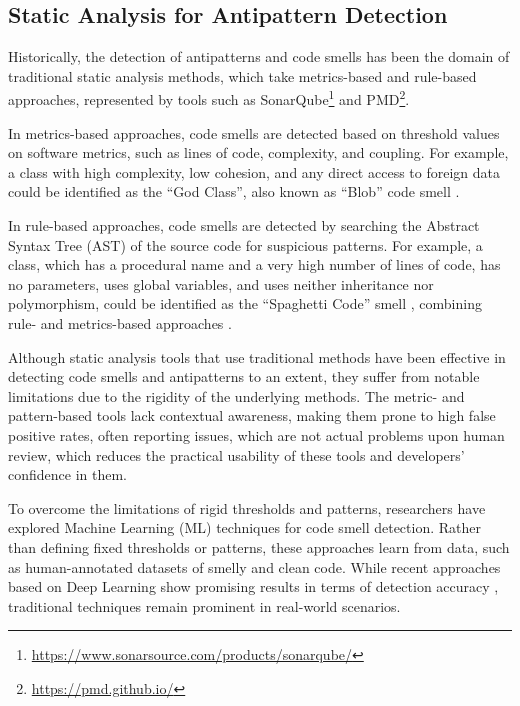 \documentclass{article}
\begin{document}
\subsection{Static Analysis for Antipattern Detection}\label{sec:staticAnalysis}

Historically, the detection of antipatterns and code smells has been the domain of traditional static analysis methods, which take metrics-based and rule-based approaches, represented by tools such as SonarQube\footnote{\hyperlink{https://www.sonarsource.com/products/sonarqube/}{https://www.sonarsource.com/products/sonarqube/}} and PMD\footnote{\hyperlink{https://pmd.github.io/}{https://pmd.github.io/}}. 

In metrics-based approaches, code smells are detected based on threshold values on software metrics, such as lines of code, complexity, and coupling. For example, a class with high complexity, low cohesion, and any direct access to foreign data could be identified as the “God Class”, also known as “Blob” code smell \cites[Ch. 3.3]{Riel1996-tv}[pp. 73–84]{brown1998antipatterns}[p. 355]{DBLP:conf/icsm/Marinescu04}.

In rule-based approaches, code smells are detected by searching the Abstract Syntax Tree (AST) of the source code for suspicious patterns. For example, a class, which has a procedural name and a very high number of lines of code, has no parameters, uses global variables, and uses neither inheritance nor polymorphism, could be identified as the “Spaghetti Code” smell \cite[pp. 119–137]{brown1998antipatterns}, combining rule- and metrics-based approaches \cite[p. 27]{DBLP:journals/tse/MohaGDM10}.

Although static analysis tools that use traditional methods have been effective in detecting code smells and antipatterns to an extent, they suffer from notable limitations due to the rigidity of the underlying methods. The metric- and pattern-based tools lack contextual awareness, making them prone to high false positive rates, often reporting issues, which are not actual problems upon human review, which reduces the practical usability of these tools and developers' confidence in them.

To overcome the limitations of rigid thresholds and patterns, researchers have explored Machine Learning (ML) techniques for code smell detection. Rather than defining fixed thresholds or patterns, these approaches learn from data, such as human-annotated datasets of smelly and clean code. While recent approaches based on Deep Learning show promising results in terms of detection accuracy \cite[pp. 3492–3494]{DBLP:journals/cluster/MalhotraJK23}, traditional techniques remain prominent in real-world scenarios.
\end{document}

